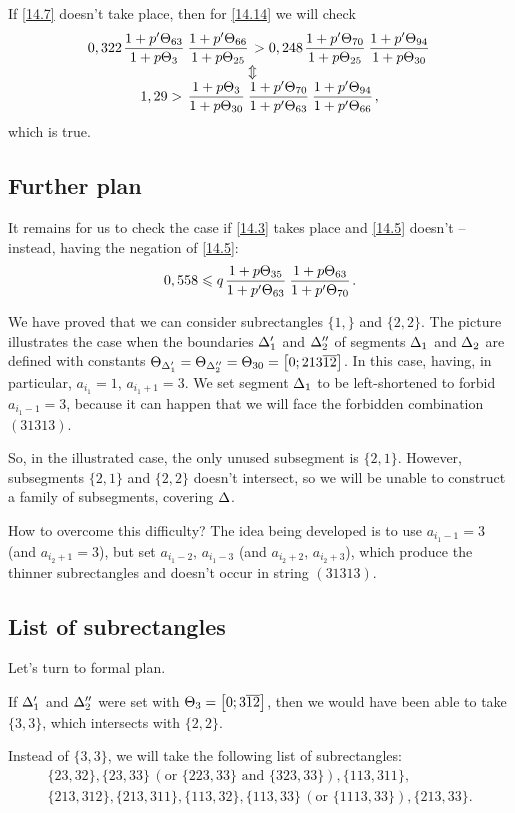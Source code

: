 If \ref{14.7} doesn't take place, then for \ref{14.14} we will check
\begin{gather*}
	0,322 \pu{63}{3} \pu{66}{25} > 0,248 \pu{70}{25} \pu{94}{30}\\
	\ArrowBetweenLines
	1,29 > \uu{3}{30} \pp{70}{63} \pp{94}{66},
\end{gather*}
which is true.

\subsection{Further plan}

It remains for us to check the case if \ref{14.3} takes place and \ref{14.5} doesn't --
instead, having the negation of \ref{14.5}:
\begin{equation}\label{14.15}
	0,558 \leqslant q \up{35}{63} \up{63}{70}.
\end{equation}

We have proved that we can consider subrectangles $\{1,\}$ and $\{2, 2\}$.
The picture illustrates the case when
the boundaries $\Delta_1'$ and $\Delta_2''$ of segments $\Delta_1$ and $\Delta_2$ are defined
with constants $\Theta_{\Delta_1'} = \Theta_{\Delta_2''} = \Theta_{30} = \left[0; 213\overline{12}\right]$.
In this case, having, in particular, $a_{i_1} = 1$, $a_{i_1 + 1} = 3$.
We set segment $\Delta_1$ to be left-shortened to forbid $a_{i_1 - 1} = 3$,
because it can happen that we will face the forbidden combination $(31313)$.

So, in the illustrated case, the only unused subsegment is $\{2, 1\}$.
However, subsegments $\{2, 1\}$ and $\{2, 2\}$ doesn't intersect,
so we will be unable to construct a family of subsegments, covering $\Delta$.

How to overcome this difficulty?
The idea being developed is to use $a_{i_1 - 1} = 3$ (and $a_{i_2 + 1} = 3$),
but set $a_{i_1 - 2},\, a_{i_1 - 3}$ (and $a_{i_2 + 2},\, a_{i_2 + 3}$),
which produce the thinner subrectangles and doesn't occur in string $(31313)$.

\subsection{List of subrectangles}

Let's turn to formal plan.

If $\Delta_1'$ and $\Delta_2''$ were set with $\Theta_{3} = \left[0; 3\overline{12}\right]$,
then we would have been able to take $\{3, 3\}$, which intersects with $\{2, 2\}$.

Instead of $\{3, 3\}$, we will take the following list of subrectangles:
\begin{gather*}
	\{23, 32\}, \{23, 33\} \,(\text{or } \{223, 33\} \text{ and } \{323, 33\}), \{113, 311\},\\
	\{213, 312\}, \{213, 311\}, \{113, 32\}, \{113, 33\} \,(\text{or } \{1113, 33\}), \{213, 33\}.
\end{gather*}

